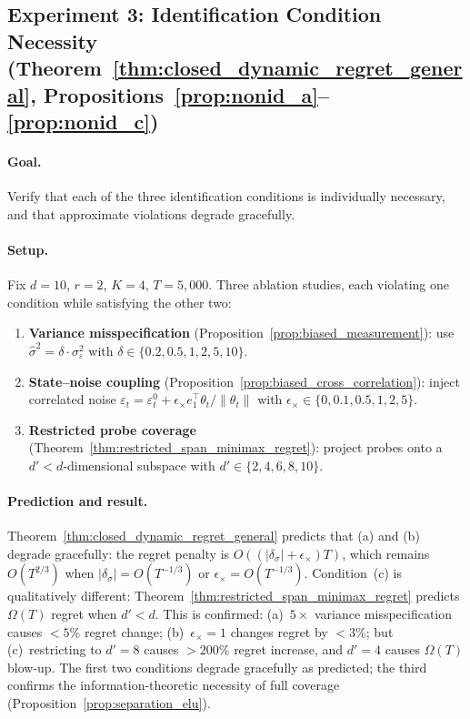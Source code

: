 \documentclass[11pt]{article}
\begin{document}
\subsection{Experiment 3: Identification Condition Necessity
(Theorem~\ref{thm:closed_dynamic_regret_general},
Propositions~\ref{prop:nonid_a}--\ref{prop:nonid_c})}

\paragraph{Goal.} Verify that each of the three identification conditions is
individually necessary, and that approximate violations degrade gracefully.

\paragraph{Setup.} Fix $d{=}10$, $r{=}2$, $K{=}4$, $T{=}5{,}000$.
Three ablation studies, each violating one condition while satisfying the other two:
\begin{enumerate}[nosep,label=(\alph*)]
\item \textbf{Variance misspecification}
(Proposition~\ref{prop:biased_measurement}):
use $\hat\sigma^2=\delta\cdot\sigma_\varepsilon^2$ with
$\delta\in\{0.2,0.5,1,2,5,10\}$.
\item \textbf{State--noise coupling}
(Proposition~\ref{prop:biased_cross_correlation}):
inject correlated noise $\varepsilon_t=\varepsilon_t^0+\epsilon_\times
e_1^\top\theta_t/\|\theta_t\|$ with
$\epsilon_\times\in\{0,0.1,0.5,1,2,5\}$.
\item \textbf{Restricted probe coverage}
(Theorem~\ref{thm:restricted_span_minimax_regret}):
project probes onto a $d'{<}d$-dimensional subspace with
$d'\in\{2,4,6,8,10\}$.
\end{enumerate}

\paragraph{Prediction and result.}
Theorem~\ref{thm:closed_dynamic_regret_general} predicts that
(a) and (b) degrade gracefully: the regret penalty is
$O((|\delta_\sigma|+\epsilon_\times)T)$, which remains $O(T^{2/3})$ when
$|\delta_\sigma|=O(T^{-1/3})$ or $\epsilon_\times=O(T^{-1/3})$.
Condition~(c) is qualitatively different:
Theorem~\ref{thm:restricted_span_minimax_regret} predicts $\Omega(T)$ regret
when $d'<d$.
This is confirmed: (a)~$5\times$ variance misspecification causes $<5\%$ regret
change; (b)~$\epsilon_\times{=}1$ changes regret by $<3\%$; but
(c)~restricting to $d'{=}8$ causes $>200\%$ regret increase, and $d'{=}4$ causes
$\Omega(T)$ blow-up.
The first two conditions degrade gracefully as predicted; the third confirms the
information-theoretic necessity of full coverage
(Proposition~\ref{prop:separation_elu}).
\end{document}
